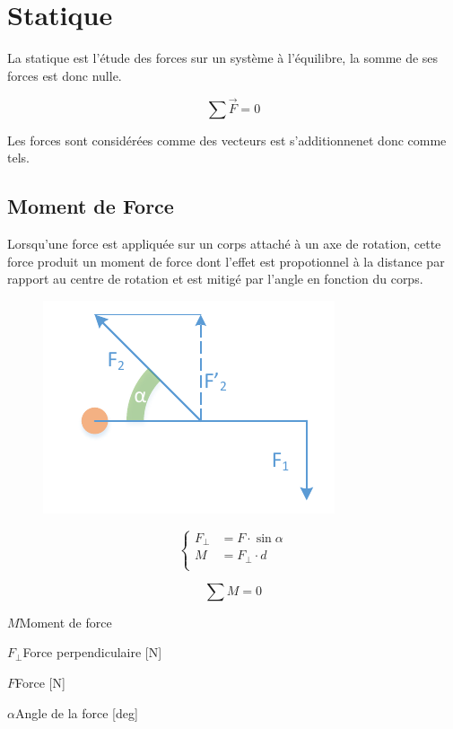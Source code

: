 \documentclass[12pt,a4paper]{article} %
\begin{document}
\newpage

\section{Statique}
La statique est l'étude des forces sur un système à l'équilibre, la somme de ses forces est donc nulle.

	\[\sum \vec{F} = 0\]

Les forces sont considérées comme des vecteurs est s'additionnenet donc comme tels.

\subsection{Moment de Force}
Lorsqu'une force est appliquée sur un corps attaché à un axe de rotation, cette force produit un moment de force dont l'effet est propotionnel à la distance par rapport au centre de rotation et est mitigé par l'angle en fonction du corps.
\par\hspace{1em}

\begin{figure}[h]
	\centering
	\includegraphics{Statique-Moments}
\end{figure}
\begin{mdframed}[leftmargin=2em, rightmargin=2em]
	\begin{twocols}[0.5][0.5]
	\[
		\left\{
			\begin{aligned}
			F_\perp &= F \cdot \sin \alpha \\
			M &= F_\perp \cdot d \\
			\end{aligned}
		\right.
	\]

	\[\sum M = 0\]
	\nextcol
	\begin{vardef}
		\item{$M$}{Moment de force}
		\item{$F_\perp$}{Force perpendiculaire [N]}
		\item{$F$}{Force [N]}
		\item{$\alpha$}{Angle de la force [deg]}
	\end{vardef}
	\end{twocols}
\end{mdframed}
\end{document}

